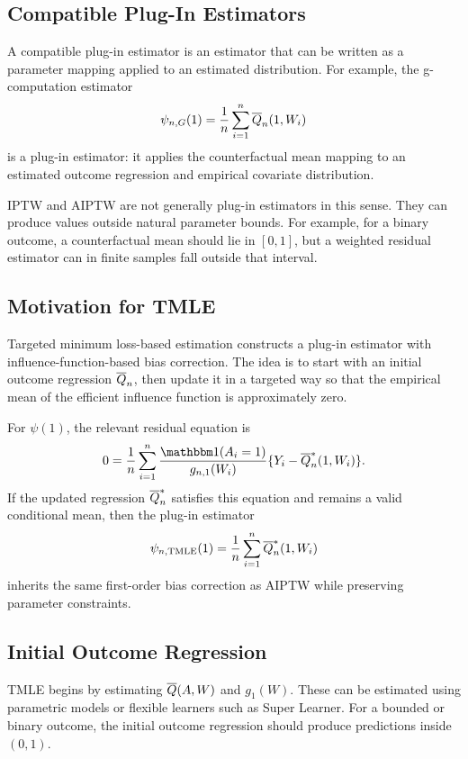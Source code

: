 \label{lec:7-7}

\subsection{Compatible Plug-In Estimators}

A compatible plug-in estimator is an estimator that can be written as a parameter
mapping applied to an estimated distribution. For example, the g-computation
estimator
\[
\psi_{n,G}(1)=\frac{1}{n}\sum_{i=1}^n\overline{Q}_n(1,W_i)
\]
is a plug-in estimator: it applies the counterfactual mean mapping to an estimated
outcome regression and empirical covariate distribution.

IPTW and AIPTW are not generally plug-in estimators in this sense. They can produce
values outside natural parameter bounds. For example, for a binary outcome, a
counterfactual mean should lie in $[0,1]$, but a weighted residual estimator can in
finite samples fall outside that interval.

\subsection{Motivation for TMLE}

Targeted minimum loss-based estimation constructs a plug-in estimator with
influence-function-based bias correction. The idea is to start with an initial outcome
regression $\overline{Q}_n$, then update it in a targeted way so that the empirical mean of
the efficient influence function is approximately zero.

For $\psi(1)$, the relevant residual equation is
\[
0=
\frac{1}{n}\sum_{i=1}^n
\frac{\ind(A_i=1)}{g_{n,1}(W_i)}
\{Y_i-\Qbar_n^*(1,W_i)\}.
\]
If the updated regression $\overline{Q}_n^*$ satisfies this equation and remains a valid
conditional mean, then the plug-in estimator
\[
\psi_{n,\operatorname{TMLE}}(1)=\frac{1}{n}\sum_{i=1}^n\overline{Q}_n^*(1,W_i)
\]
inherits the same first-order bias correction as AIPTW while preserving parameter
constraints.

\subsection{Initial Outcome Regression}

TMLE begins by estimating $\overline{Q}(A,W)$ and $g_1(W)$. These can be estimated using
parametric models or flexible learners such as Super Learner. For a bounded or binary
outcome, the initial outcome regression should produce predictions inside $(0,1)$.

